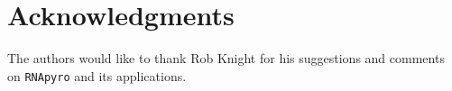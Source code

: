 \section{Acknowledgments}
\label{sec:acknowledgments}
The authors would like to thank Rob Knight
for his suggestions and comments on \texttt{RNApyro}
and its applications.